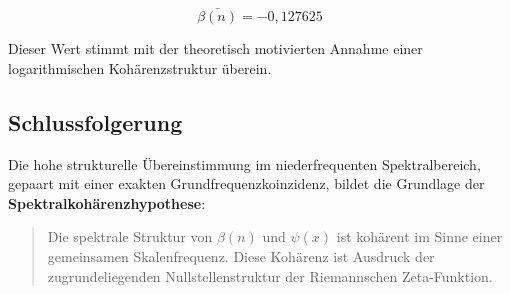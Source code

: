 \begin{equation}
\boxed{\bar{\beta(n)} = -0{,}127625}
\end{equation}

Dieser Wert stimmt mit der theoretisch motivierten Annahme einer logarithmischen Kohärenzstruktur überein.

\subsection*{Schlussfolgerung}

Die hohe strukturelle Übereinstimmung im niederfrequenten Spektralbereich, gepaart mit einer exakten Grundfrequenzkoinzidenz, bildet die Grundlage der \textbf{Spektralkohärenzhypothese}:

\begin{quote}
Die spektrale Struktur von $\beta(n)$ und $\psi(x)$ ist kohärent im Sinne einer gemeinsamen Skalenfrequenz. Diese Kohärenz ist Ausdruck der zugrundeliegenden Nullstellenstruktur der Riemannschen Zeta-Funktion.
\end{quote}